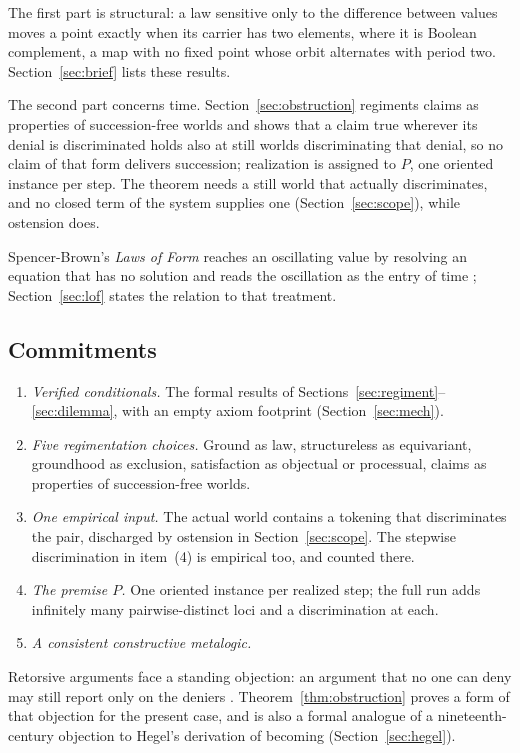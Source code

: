 \documentclass[11pt]{article}
\begin{document}
The first part is structural: a law sensitive only to the difference between values moves a point exactly when its carrier has two elements, where it is Boolean complement, a map with no fixed point whose orbit alternates with period two. Section~\ref{sec:brief} lists these results.

The second part concerns time. Section~\ref{sec:obstruction} regiments claims as properties of succession-free worlds and shows that a claim true wherever its denial is discriminated holds also at still worlds discriminating that denial, so no claim of that form delivers succession; realization is assigned to $P$, one oriented instance per step. The theorem needs a still world that actually discriminates, and no closed term of the system supplies one (Section~\ref{sec:scope}), while ostension does.

Spencer-Brown's \emph{Laws of Form} reaches an oscillating value by resolving an equation that has no solution and reads the oscillation as the entry of time \cite{spencerbrown1969}; Section~\ref{sec:lof} states the relation to that treatment.

\subsection*{Commitments}

\begin{enumerate}[label=(\arabic*),itemsep=1pt]
\item \emph{Verified conditionals.} The formal results of Sections~\ref{sec:regiment}--\ref{sec:dilemma}, with an empty axiom footprint (Section~\ref{sec:mech}).
\item \emph{Five regimentation choices.} Ground as law, structureless as equivariant, groundhood as exclusion, satisfaction as objectual or processual, claims as properties of succession-free worlds.
\item \emph{One empirical input.} The actual world contains a tokening that discriminates the pair, discharged by ostension in Section~\ref{sec:scope}. The stepwise discrimination in item~(4) is empirical too, and counted there.
\item \emph{The premise $P$.} One oriented instance per realized step; the full run adds infinitely many pairwise-distinct loci and a discrimination at each.
\item \emph{A consistent constructive metalogic.}
\end{enumerate}

Retorsive arguments face a standing objection: an argument that no one can deny may still report only on the deniers \cite{stroud1968}. Theorem~\ref{thm:obstruction} proves a form of that objection for the present case, and is also a formal analogue of a nineteenth-century objection to Hegel's derivation of becoming (Section~\ref{sec:hegel}).
\end{document}
